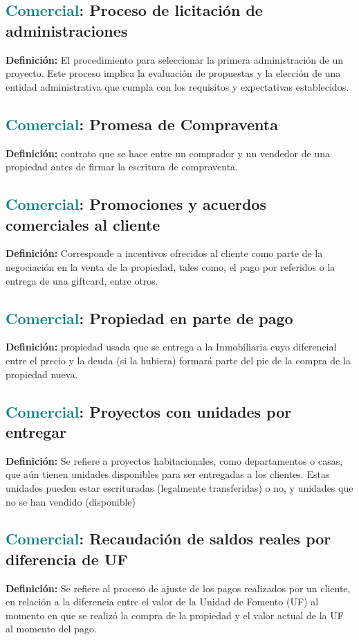 \documentclass[12pt]{article}
\begin{document}
\subsection{\textcolor{teal}{Comercial}: Proceso de licitación de administraciones}
\textbf{Definición:} El procedimiento para seleccionar la primera administración de un proyecto. Este proceso implica la evaluación de propuestas y la elección de una entidad administrativa que cumpla con los requisitos y expectativas establecidos.
\subsection{\textcolor{teal}{Comercial}: Promesa de Compraventa}
\textbf{Definición:} contrato que se hace entre un comprador y un vendedor de una propiedad antes de firmar la escritura de compraventa.
\subsection{\textcolor{teal}{Comercial}: Promociones y acuerdos comerciales al cliente }
\textbf{Definición:} Corresponde a incentivos ofrecidos al cliente como parte de la negociación en la venta de la propiedad, tales como, el pago por referidos o la entrega de una giftcard, entre otros.
\subsection{\textcolor{teal}{Comercial}: Propiedad en parte de pago}
\textbf{Definición:} propiedad usada que se entrega a la Inmobiliaria cuyo diferencial entre el precio y la deuda (si la hubiera) formará parte del pie de la compra de la propiedad nueva.
\subsection{\textcolor{teal}{Comercial}: Proyectos con unidades por entregar}
\textbf{Definición:} Se refiere a proyectos habitacionales, como departamentos o casas, que aún tienen unidades disponibles para ser entregadas a los clientes. Estas unidades pueden estar escrituradas (legalmente transferidas) o no, y unidades que no se han vendido (disponible)
\subsection{\textcolor{teal}{Comercial}: Recaudación de saldos reales por diferencia de UF}
\textbf{Definición:} Se refiere al proceso de ajuste de los pagos realizados por un cliente, en relación a la diferencia entre el valor de la Unidad de Fomento (UF) al momento en que se realizó la compra de la propiedad y el valor actual de la UF al momento del pago.
\end{document}
